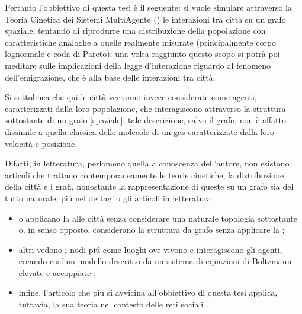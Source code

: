     Pertanto l'obbiettivo di questa tesi è il seguente: si vuole simulare attraverso la \hypertarget{acrTeorieCineticheSistemiMultiAgenti}{Teoria Cinetica dei Sistemi MultiAgente} (\TCSMA) le interazioni tra città su un grafo spaziale, tentando di riprodurre una distribuzione della popolazione con caratteristiche analoghe a quelle realmente misurate (principalmente corpo lognormale e coda di Pareto); una volta raggiunto questo scopo si potrà poi meditare sulle implicazioni della legge d'interazione riguardo al fenomeno dell'emigrazione, che è alla base delle interazioni tra città.

    Si sottolinea che qui le città verranno invece considerate come agenti, caratterizzati dalla loro popolazione, che interagiscono attraverso la struttura sottostante di un grafo [spaziale]; tale descrizione, salvo il grafo, non è affatto dissimile a quella classica delle molecole di un gas caratterizzate dalla loro velocità e posizione.
   
    Difatti, in letteratura, perlomeno quella a conoscenza dell'autore, non esistono articoli che trattano contemporaneamente le teorie cinetiche, la distribuzione della città e i grafi, nonostante la rappresentazione di queste su un grafo sia del tutto naturale; piú nel dettaglio gli articoli in letteratura
    
    \begin{itemize}[
        label=\(\diamond\),
        topsep=0.5em,
        parsep=0em,
        itemsep=0.25em,
        leftmargin=2em,
        rightmargin=1.5em,
        labelindent=30pt,
    ]
        \item o applicano la \TCSMA{} alle città senza considerare una naturale topologia sottostante \cite{Gualandi2019SDC}\footnotemark{} o, in senso opposto, considerano la struttura da grafo senza applicare la \TCSMA{} \cite{Berliant2018};
        \item altri vedono i nodi piú come luoghi ove vivono e interagiscono gli agenti, creando cosí un modello descritto da un sistema di equazioni di Boltzmann elevate e accoppiate \cite{Loy2021};
        \item infine, l'articolo che piú si avvicina all'obbiettivo di questa tesi applica, tuttavia, la sua teoria nel contesto delle reti sociali \cite{Nurisso2024}.
    \end{itemize}


